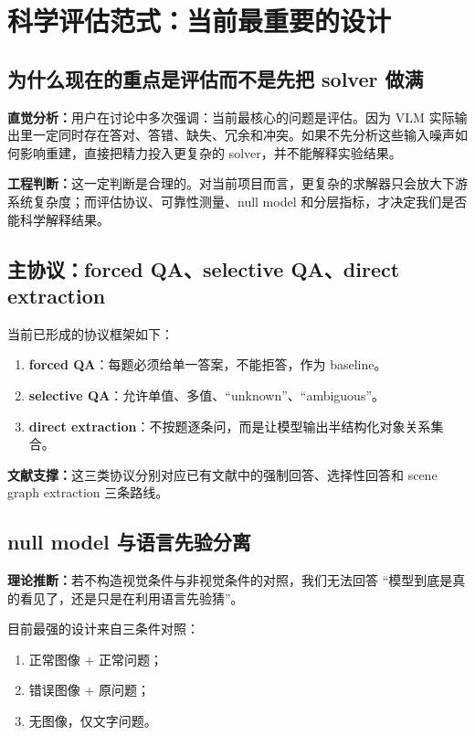\documentclass[11pt,a4paper]{ctexart}
\newcommand{\intuition}[1]{\textbf{直觉分析：}#1}
\newcommand{\evidence}[1]{\textbf{文献支撑：}#1}
\newcommand{\engineering}[1]{\textbf{工程判断：}#1}
\newcommand{\theorynote}[1]{\textbf{理论推断：}#1}
\begin{document}
\section{科学评估范式：当前最重要的设计}

\subsection{为什么现在的重点是评估而不是先把 solver 做满}

\intuition{用户在讨论中多次强调：当前最核心的问题是评估。因为 VLM 实际输出里一定同时存在答对、答错、缺失、冗余和冲突。如果不先分析这些输入噪声如何影响重建，直接把精力投入更复杂的 solver，并不能解释实验结果。}

\engineering{这一定判断是合理的。对当前项目而言，更复杂的求解器只会放大下游系统复杂度；而评估协议、可靠性测量、null model 和分层指标，才决定我们是否能科学解释结果。}

\subsection{主协议：forced QA、selective QA、direct extraction}

当前已形成的协议框架如下：
\begin{enumerate}[label=\arabic*.]
  \item \textbf{forced QA}：每题必须给单一答案，不能拒答，作为 baseline。
  \item \textbf{selective QA}：允许单值、多值、``unknown''、``ambiguous''。
  \item \textbf{direct extraction}：不按题逐条问，而是让模型输出半结构化对象关系集合。
\end{enumerate}

\evidence{这三类协议分别对应已有文献中的强制回答、选择性回答和 scene graph extraction 三条路线。}

\subsection{null model 与语言先验分离}

\theorynote{若不构造视觉条件与非视觉条件的对照，我们无法回答 ``模型到底是真的看见了，还是只是在利用语言先验猜''。}

目前最强的设计来自三条件对照：
\begin{enumerate}[label=\textbf{\Alph*.}]
  \item 正常图像 + 正常问题；
  \item 错误图像 + 原问题；
  \item 无图像，仅文字问题。
\end{enumerate}
\end{document}
